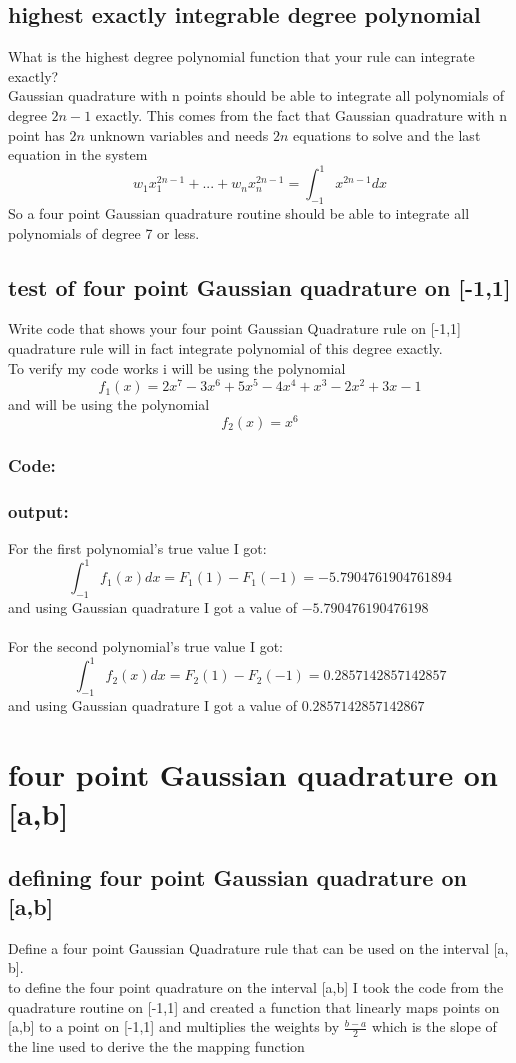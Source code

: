 \documentclass{article}
\begin{document}
\subsection{highest exactly integrable degree polynomial}
	What is the highest degree polynomial function that your rule can integrate exactly?
	\\Gaussian quadrature with n points should be able to integrate all polynomials of degree $2n-1$ exactly. This comes from the fact that Gaussian quadrature with n point has $2n$ unknown variables and needs $2n$ equations to solve and the last equation in the system  $$ w_1x_1^{2n-1} + ... +w_nx_n^{2n-1} = \int_{-1}^{1}x^{2n-1}dx$$ So a four point Gaussian quadrature routine should be able to integrate all polynomials of degree 7 or less.  
\subsection{test of four point Gaussian quadrature on [-1,1]}
	Write code that shows your four point Gaussian Quadrature rule on [-1,1] quadrature rule will in fact integrate polynomial of this degree exactly.
	\\To verify my code works i will be using the polynomial $$f_1(x)=2x^7 - 3x^6 + 5x^5 - 4x^4 + x^3 - 2x^2 + 3x - 1$$ and will be using the polynomial $$f_2(x)= x^6 $$
	\subsubsection*{Code:}
		
	\subsubsection*{output:}
		For the first polynomial's true value I got:$$\int_{-1}^{1}f_1(x)dx= F_1(1)-F_1(-1)=-5.7904761904761894$$ 
		and using Gaussian quadrature I got a value of $-5.790476190476198$ \\\\
		For the second polynomial's true value I got:$$\int_{-1}^{1}f_2(x)dx= F_2(1)-F_2(-1)=0.2857142857142857$$ 
		and using Gaussian quadrature I got a value of $0.2857142857142867$ \\
\section{four point Gaussian quadrature on [a,b]}
	\subsection{defining four point Gaussian quadrature on [a,b]}
		Define a four point Gaussian Quadrature rule that can be used on the interval [a, b].\\
		to define the four point quadrature on the interval [a,b] I took the code from the quadrature routine on [-1,1] and created a function that linearly maps points on [a,b] to a point on [-1,1] and multiplies the weights by $\frac{b-a}{2}$ which is the slope of the line used to derive the the mapping function
\end{document}
